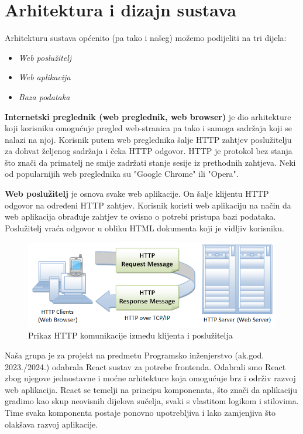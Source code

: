 \chapter{Arhitektura i dizajn sustava}

		Arhitekturu sustava općenito (pa tako i našeg) možemo podijeliti na tri dijela:
	\begin{itemize}
		\item 	\textit{Web poslužitelj}
		\item 	\textit{Web aplikacija}
		\item 	\textit{Baza podataka}		
	\end{itemize}
	
	\textbf{Internetski preglednik (web preglednik, web browser)} je dio arhitekture koji korisniku omogućuje pregled web-stranica pa tako i samoga sadržaja koji se nalazi na njoj. Korisnik putem web preglednika šalje HTTP zahtjev poslužitelju za dohvat željenog sadržaja i čeka HTTP odgovor. HTTP je protokol bez stanja što znači da primatelj ne smije zadržati stanje sesije iz prethodnih zahtjeva. Neki od popularnijih web preglednika su "Google Chrome" ili "Opera".
	
	\textbf{Web poslužitelj} je osnova svake web aplikacije. On šalje klijentu HTTP odgovor na određeni HTTP zahtjev. Korisnik koristi web aplikaciju na način da web aplikacija obrađuje zahtjev te ovisno o potrebi pristupa bazi podataka. Poslužitelj vraća odgovor u obliku HTML dokumenta koji je vidljiv korisniku.
		
    \begin{figure}[H]
    	\includegraphics[scale=1.2]{slike/HTTP.PNG} %
    	\centering
    	\caption{Prikaz HTTP komunikacije između klijenta i poslužitelja}
    	\label{fig:promjene}
    \end{figure}
    
    \textit{\newline \newline}
    
    Naša grupa je za projekt na predmetu Programsko inženjerstvo (ak.god. 2023./2024.) odabrala React sustav za potrebe frontenda. Odabrali smo React zbog njegove jednostavne i moćne arhitekture koja omogućuje brz i održiv razvoj web aplikacija. React se temelji na principu komponenata, što znači da aplikaciju gradimo kao skup neovisnih dijelova sučelja, svaki s vlastitom logikom i stilovima. Time svaka komponenta postaje ponovno upotrebljiva i lako zamjenjiva što olakšava razvoj aplikacije.
    
